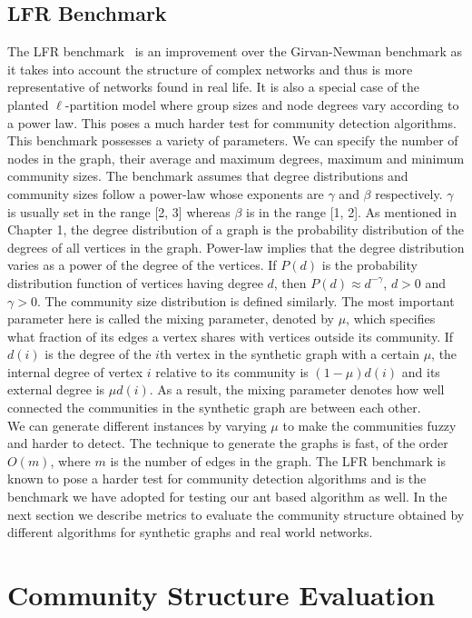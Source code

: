 \begin{spacing}{1.5}
\subsection{LFR Benchmark}
The LFR benchmark~\cite{PhysRevE.78.046110} is an improvement over the Girvan-Newman benchmark as it takes into account the structure of complex networks and thus is more representative of networks found in real life. It is also a special case of the planted $\ell$-partition model where group sizes and node degrees vary according to a power law. This poses a much harder test for community detection algorithms.\\
\indent This benchmark possesses a variety of parameters. We can specify the number of nodes in the graph, their average and maximum degrees, maximum and minimum community sizes. The benchmark assumes that degree distributions and community sizes follow a power-law whose exponents are $\gamma$ and $\beta$ respectively. $\gamma$ is usually set in the range [2, 3] whereas $\beta$ is in the range [1, 2]. As mentioned in Chapter 1, the degree distribution of a graph is the probability distribution of the degrees of all vertices in the graph. Power-law implies that the degree distribution varies as a power of the degree of the vertices. If $P(d)$ is the probability distribution function of vertices having degree $d$, then $P(d)\approx d^{-\gamma}$, $d > 0$ and $\gamma > 0$. The community size distribution is defined similarly. The most important parameter here is called the mixing parameter, denoted by $\mu$, which specifies what fraction of its edges a vertex shares with vertices outside its community. If $d(i)$ is the degree of the $i$th vertex in the synthetic graph with a certain $\mu$, the internal degree of vertex $i$ relative to its community is $(1-\mu)d(i)$ and its external degree is $\mu d(i)$. As a result, the mixing parameter denotes how well connected the communities in the synthetic graph are between each other.\\
\indent We can generate different instances by varying $\mu$ to make the communities fuzzy and harder to detect. The technique to generate the graphs is fast, of the order $O(m)$, where $m$ is the number of edges in the graph. The LFR benchmark is known to pose a harder test for community detection algorithms and is the benchmark we have adopted for testing our ant based algorithm as well. In the next section we describe metrics to evaluate the community structure obtained by different algorithms for synthetic graphs and real world networks.
\section{Community Structure Evaluation}

\end{spacing}

